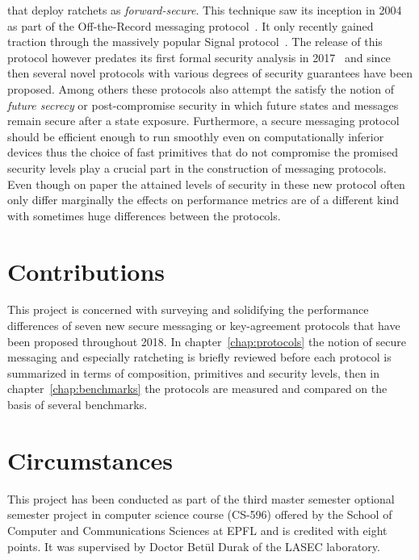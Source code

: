 \documentclass[11pt,a4paper,twoside,openright,bibliography=totoc]{scrbook}
\begin{document}
that deploy ratchets as \textit{forward-secure}. This technique saw
its inception in 2004 as part of the Off-the-Record messaging
protocol~\cite{borisov2004off}. It only recently gained traction
through the massively popular Signal protocol~\cite{perrin2016double}.
The release of this protocol however predates its first formal
security analysis in 2017~\cite{cohn2017formal}
and since then several novel protocols with various degrees of
security guarantees have been proposed. Among others
these protocols also attempt the satisfy the notion of
\textit{future secrecy} or post-compromise security in which future states and
messages remain secure after a state exposure. Furthermore, a secure messaging
protocol should be efficient enough to run smoothly even on
computationally inferior devices thus the choice of fast primitives
that do not compromise the promised security levels play a crucial
part in the construction of messaging protocols. Even though on paper
the attained levels of security in these new protocol often only
differ marginally the effects on performance metrics are of a
different kind with sometimes huge differences between the protocols.


\section{Contributions}
\label{sec:contributions}

This project is concerned with surveying and solidifying the
performance differences of seven new secure messaging or key-agreement
protocols that have been proposed throughout 2018. In
chapter~\ref{chap:protocols} the notion of secure messaging and
especially ratcheting is briefly reviewed before each protocol is
summarized in terms of composition, primitives and security levels, then in
chapter~\ref{chap:benchmarks} the protocols are measured and compared
on the basis of several benchmarks.

\section{Circumstances}
\label{sec:circumstances}

This project has been conducted as part of the third master semester optional
semester project in computer science course (CS-596) offered by the
School of Computer and Communications Sciences at EPFL and is credited
with eight points. It was supervised by Doctor Betül Durak of
the LASEC laboratory.
\end{document}
